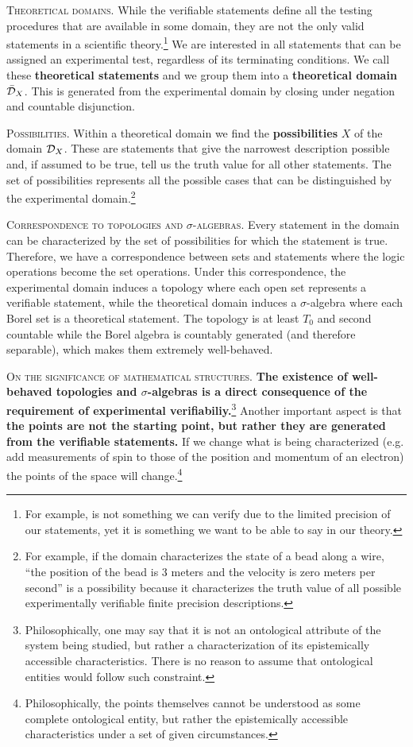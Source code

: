 \documentclass[10pt,twocolumn, nofootinbib]{revtex4-1}
\newcommand\partitle[1]{\textsc{#1}.}
\begin{document}
\partitle{Theoretical domains} While the verifiable statements define all the testing procedures that are available in some domain, they are not the only valid statements in a scientific theory.\footnote{For example,  is not something we can verify due to the limited precision of our statements, yet it is something we want to be able to say in our theory.} We are interested in all statements that can be assigned an experimental test, regardless of its terminating conditions. We call these \textbf{theoretical statements} and we group them into a \textbf{theoretical domain} $\bar{\mathcal{D}}_X$. This is generated from the experimental domain by closing under negation and countable disjunction.

\partitle{Possibilities} Within a theoretical domain we find the \textbf{possibilities} $X$ of the domain $\mathcal{D}_X$. These are statements that give the narrowest description possible and, if assumed to be true, tell us the truth value for all other statements. The set of possibilities represents all the possible cases that can be distinguished by the experimental domain.\footnote{For example, if the domain characterizes the state of a bead along a wire, ``the position of the bead is 3 meters and the velocity is zero meters per second'' is a possibility because it characterizes the truth value of all possible experimentally verifiable finite precision descriptions.}

\partitle{Correspondence to topologies and $\sigma$-algebras} Every statement in the domain can be characterized by the set of possibilities for which the statement is true. Therefore, we have a correspondence between sets and statements where the logic operations become the set operations. Under this correspondence, the experimental domain induces a topology where each open set represents a verifiable statement, while the theoretical domain induces a $\sigma$-algebra where each Borel set is a theoretical statement. The topology is at least $T_0$ and second countable while the Borel algebra is countably generated (and therefore separable), which makes them extremely well-behaved.

\partitle{On the significance of mathematical structures} \textbf{The existence of well-behaved topologies and $\sigma$-algebras is a direct consequence of the requirement of experimental verifiabiliy.}\footnote{Philosophically, one may say that it is not an ontological attribute of the system being studied, but rather a characterization of its epistemically accessible characteristics. There is no reason to assume that ontological entities would follow such constraint.} Another important aspect is that \textbf{the points are not the starting point, but rather they are generated from the verifiable statements.} If we change what is being characterized (e.g. add measurements of spin to those of the position and momentum of an electron) the points of the space will change.\footnote{Philosophically, the points themselves cannot be understood as some complete ontological entity, but rather the epistemically accessible characteristics under a set of given circumstances.}
\end{document}
